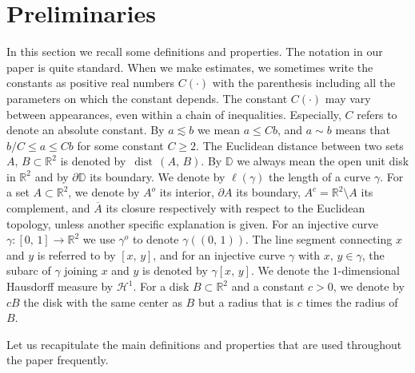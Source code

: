 \documentclass[reqno,11pt]{amsart}
\def\dist{{\mathop\mathrm{\,dist\,}}}
\numberwithin{equation}{section}
\theoremstyle{remark}
\begin{document}
\section{Preliminaries}\label{sec:preliminaries}
In this section we recall some definitions and properties. 
The notation in our paper is quite standard. When we make estimates, we sometimes write the constants as 
positive real numbers $C(\cdot)$ with
the parenthesis including all the parameters on which the constant depends. The constant $C(\cdot)$ may
vary between appearances, even within a chain of inequalities. 
Especially, $C$ refers to  denote an absolute constant. 
By $a\lesssim b$ we mean $a\le C b$, and $a \sim b$ means that $b/C \le a \le Cb$ for some constant $C \ge 2$. 
The Euclidean distance between two sets $A,\,B \subset \mathbb R^2$ is denoted by $\dist(A,\,B)$. 
By $\mathbb D$ we always mean the open unit disk in $\mathbb R^2$ and by $\partial \mathbb D$ its boundary.
We denote by $\ell(\gamma)$ the length of a curve $\gamma$. For a set $A\subset \mathbb R^2$, we denote by $A^o$ its interior, $\partial A$ its boundary, $A^c=\mathbb R^2\setminus A$ its complement, and $\overline A$ its closure respectively with respect to the Euclidean topology, unless another specific explanation is given. 
For an injective curve $\gamma\colon [0,\,1] \to \mathbb R^2$ we use $\gamma^o$ to denote $\gamma((0,\,1))$.
The line segment connecting $x$ and $y$ is referred to by $[x,\,y]$, and for an injective curve $\gamma$ with $x,\,y\in \gamma$, the subarc of $\gamma$ joining $x$ and $y$ is denoted by $\gamma[x,\,y]$. 
We denote the $1$-dimensional Hausdorff measure by $\mathcal H^1$. 
For a disk $B\subset \mathbb R^2$ and a constant $c>0$, we denote by $cB$ the disk with the same center as $B$ but a radius that is $c$ times the radius of $B$.


  Let us recapitulate the main definitions and properties that are used throughout the paper frequently.
\end{document}
